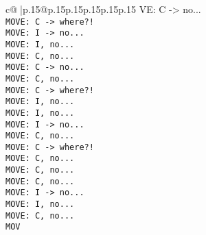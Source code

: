 \documentclass{article}
\begin{document}
{\begin{supertabular}{c@{$\;$}|p{.15\linewidth}@{}p{.15\linewidth}p{.15\linewidth}p{.15\linewidth}p{.15\linewidth}p{.15\linewidth}}
{{{VE: C -> no...\\ \tt  MOVE: C -> where?!\\ \tt  MOVE: I -> no...\\ \tt  MOVE: I, no...\\ \tt  MOVE: C, no...\\ \tt  MOVE: C -> no...\\ \tt  MOVE: C, no...\\ \tt  MOVE: C -> where?!\\ \tt  MOVE: I, no...\\ \tt  MOVE: I, no...\\ \tt  MOVE: I -> no...\\ \tt  MOVE: C, no...\\ \tt  MOVE: C -> where?!\\ \tt  MOVE: C, no...\\ \tt  MOVE: C, no...\\ \tt  MOVE: C, no...\\ \tt  MOVE: I -> no...\\ \tt  MOVE: I, no...\\ \tt  MOVE: C, no...\\ \tt  MOV}}}
\end{supertabular}}
\end{document}
